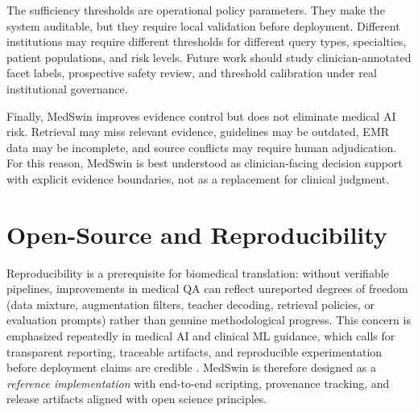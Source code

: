 \documentclass[conference]{IEEEtran}
\begin{document}
The sufficiency thresholds are operational policy parameters. They make the system auditable, but they require local validation before deployment. Different institutions may require different thresholds for different query types, specialties, patient populations, and risk levels. Future work should study clinician-annotated facet labels, prospective safety review, and threshold calibration under real institutional governance.

Finally, MedSwin improves evidence control but does not eliminate medical AI risk. Retrieval may miss relevant evidence, guidelines may be outdated, EMR data may be incomplete, and source conflicts may require human adjudication. For this reason, MedSwin is best understood as clinician-facing decision support with explicit evidence boundaries, not as a replacement for clinical judgment.


\section{Open-Source and Reproducibility}
\label{subsec:opensource-reproducibility}

Reproducibility is a prerequisite for biomedical translation: without verifiable pipelines, improvements in medical QA can reflect unreported degrees of freedom (data mixture, augmentation filters, teacher decoding, retrieval policies, or evaluation prompts) rather than genuine methodological progress. This concern is emphasized repeatedly in medical AI and clinical ML guidance, which calls for transparent reporting, traceable artifacts, and reproducible experimentation before deployment claims are credible \cite{vollmer2020mlhealth,beam2018mlhealth}. MedSwin is therefore designed as a \emph{reference implementation} with end-to-end scripting, provenance tracking, and release artifacts aligned with open science principles.
\end{document}
